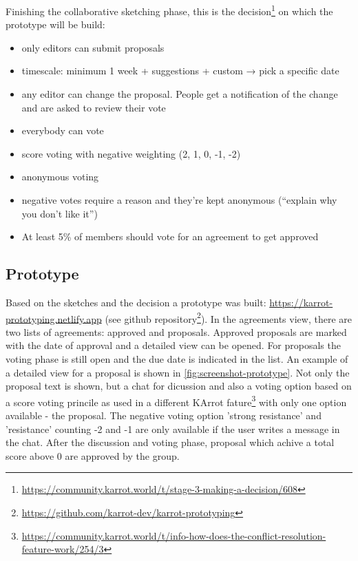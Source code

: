 \documentclass[
	a4paper,%
	11pt,%
	]{article}
\begin{document}
Finishing the collaborative sketching phase, this is the decision\footnote{\label{url:3Decision}\url{https://community.karrot.world/t/stage-3-making-a-decision/608}} on which the prototype will be build:
\begin{itemize}
	\item only editors can submit proposals
	\item timescale: minimum 1 week + suggestions + custom → pick a specific date
	\item any editor can change the proposal. People get a notification of the change and are asked to review their vote
	\item everybody can vote
	\item score voting with negative weighting (2, 1, 0, -1, -2)
	\item anonymous voting
	\item negative votes require a reason and they’re kept anonymous (“explain why you don’t like it”)
	\item At least 5\% of members should vote for an agreement to get approved	
\end{itemize}

    
\subsection{Prototype}\label{subsec:prototype}

Based on the sketches and the decision a prototype was built: \url{https://karrot-prototyping.netlify.app} (see github repository\footnote{\label{url:prototype-github}\url{https://github.com/karrot-dev/karrot-prototyping}}). In the agreements view, there are two lists of agreements: approved and proposals. Approved proposals are marked with the date of approval and a detailed view can be opened. For proposals the voting phase is still open and the due date is indicated in the list. An example of a detailed view for a proposal is shown in \autoref{fig:screenshot-prototype}. Not only the proposal text is shown, but a chat for dicussion and also a voting option based on a score voting princile as used in a different KArrot fature\footnote{\label{url:score-vote}\href{https://community.karrot.world/t/info-how-does-the-conflict-resolution-feature-work/254/3}{https://community.karrot.world/t/info-how-does-the-conflict-resolution-feature-work/254/3}} with only one option available - the proposal. The negative voting option 'strong resistance' and 'resistance' counting -2 and -1 are only available if the user writes a message in the chat. After the discussion and voting phase, proposal which achive a total score above 0 are approved by the group.
\end{document}
